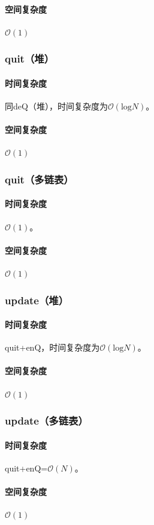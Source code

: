 \documentclass{homework}
\begin{document}
    \paragraph{空间复杂度}$\mathcal{O}(1)$
    \subsubsection{quit（堆）}
    \paragraph{时间复杂度}同deQ（堆），时间复杂度为$\mathcal{O}(\mathrm{log}N)$。
    \paragraph{空间复杂度}$\mathcal{O}(1)$
    \subsubsection{quit（多链表）}
    \paragraph{时间复杂度}$\mathcal{O}(1)$。
    \paragraph{空间复杂度}$\mathcal{O}(1)$
    \subsubsection{update（堆）}
    \paragraph{时间复杂度}quit+enQ，时间复杂度为$\mathcal{O}(\mathrm{log}N)$。
    \paragraph{空间复杂度}$\mathcal{O}(1)$
    \subsubsection{update（多链表）}
    \paragraph{时间复杂度}quit+enQ=$\mathcal{O}(N)$。
    \paragraph{空间复杂度}$\mathcal{O}(1)$
\end{document}
